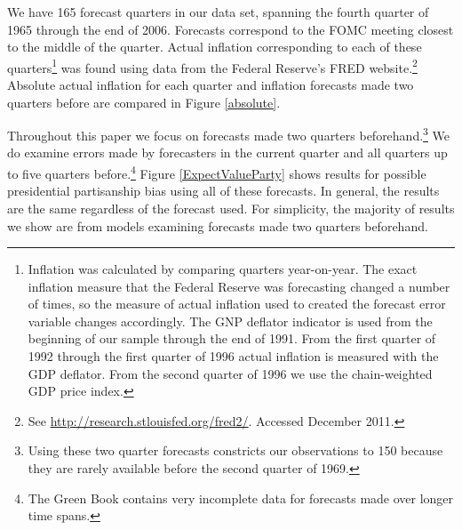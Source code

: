 \documentclass[a4paper]{article}
\begin{document}
We have 165 forecast quarters in our data set, spanning the fourth quarter of 1965 through the end of 2006. Forecasts correspond to the FOMC meeting closest to the middle of the quarter. Actual inflation corresponding to each of these quarters\footnote{Inflation was calculated by comparing quarters year-on-year. The exact inflation measure that the Federal Reserve was forecasting changed a number of times, so the measure of actual inflation used to created the forecast error variable changes accordingly. The GNP deflator indicator is used from the beginning of our sample through the end of 1991. From the first quarter of 1992 through the first quarter of 1996 actual inflation is measured with the GDP deflator.  From the second quarter of 1996 we use the chain-weighted GDP price index.} was found using data from the Federal Reserve's FRED website.\footnote{See \url{http://research.stlouisfed.org/fred2/}. Accessed December 2011.} Absolute actual inflation for each quarter and inflation forecasts made two quarters before are compared in Figure \ref{absolute}. 

Throughout this paper we focus on forecasts made two quarters beforehand.\footnote{Using these two quarter forecasts constricts our observations to 150 because they are rarely available before the second quarter of 1969.} We do examine errors made by forecasters in the current quarter and all quarters up to five quarters before.\footnote{The Green Book contains very incomplete data for forecasts made over longer time spans.} Figure \ref{ExpectValueParty} shows results for possible presidential partisanship bias using all of these forecasts. In general, the results are the same regardless of the forecast used. For simplicity, the majority of results we show are from models examining forecasts made two quarters beforehand.
\end{document}
